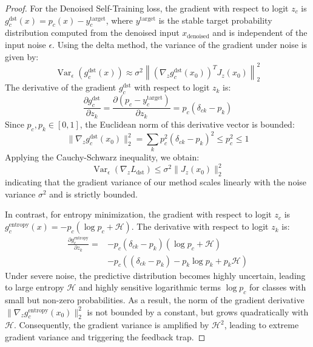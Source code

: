 \documentclass{article}
\theoremstyle{plain}
\theoremstyle{definition}
\theoremstyle{remark}
\begin{document}
\begin{proof}
For the Denoised Self-Training loss, the gradient with respect to logit $z_c$ is $g_c^{\text{dst}}(x) = p_c(x) - y^{\text{target}}_c$, where $y^{\text{target}}$ is the stable target probability distribution computed from the denoised input $x_{\text{denoised}}$ and is independent of the input noise $\epsilon$. Using the delta method, the variance of the gradient under noise is given by:
\begin{equation}
    \operatorname{Var}_{\epsilon} \left( g_c^{\text{dst}}(x) \right) \approx \sigma^2 \left\| \left( \nabla_z g_c^{\text{dst}}(x_0) \right)^T J_z(x_0) \right\|_2^2
\end{equation}
The derivative of the gradient $g_c^{\text{dst}}$ with respect to logit $z_k$ is:
\begin{equation}
    \frac{\partial g_c^{\text{dst}}}{\partial z_k} = \frac{\partial (p_c - y^{\text{target}}_c)}{\partial z_k} = p_c (\delta_{ck} - p_k)
\end{equation}
Since $p_c, p_k \in [0, 1]$, the Euclidean norm of this derivative vector is bounded:
\begin{equation}
    \|\nabla_z g_c^{\text{dst}}(x_0)\|_2^2 = \sum_k p_c^2 (\delta_{ck} - p_k)^2 \le p_c^2 \le 1
\end{equation}
Applying the Cauchy-Schwarz inequality, we obtain:
\begin{equation}
    \operatorname{Var}_{\epsilon} \left( \nabla_{z} L_{\text{dst}} \right) \le \sigma^2 \|J_z(x_0)\|_2^2
\end{equation}
indicating that the gradient variance of our method scales linearly with the noise variance $\sigma^2$ and is strictly bounded.

In contrast, for entropy minimization, the gradient with respect to logit $z_c$ is $g_c^{\text{entropy}}(x) = -p_c (\log p_c + \mathcal{H})$. The derivative with respect to logit $z_k$ is:
\begin{equation}
\begin{split}
    \frac{\partial g_c^{\text{entropy}}}{\partial z_k} = {} & -p_c (\delta_{ck} - p_k) (\log p_c + \mathcal{H}) \\
    & - p_c \left( (\delta_{ck} - p_k) - p_k \log p_k + p_k \mathcal{H} \right)
\end{split}
\end{equation}
Under severe noise, the predictive distribution becomes highly uncertain, leading to large entropy $\mathcal{H}$ and highly sensitive logarithmic terms $\log p_c$ for classes with small but non-zero probabilities. As a result, the norm of the gradient derivative $\|\nabla_z g_c^{\text{entropy}}(x_0)\|_2^2$ is not bounded by a constant, but grows quadratically with $\mathcal{H}$. Consequently, the gradient variance is amplified by $\mathcal{H}^2$, leading to extreme gradient variance and triggering the feedback trap.
\end{proof}
\end{document}
